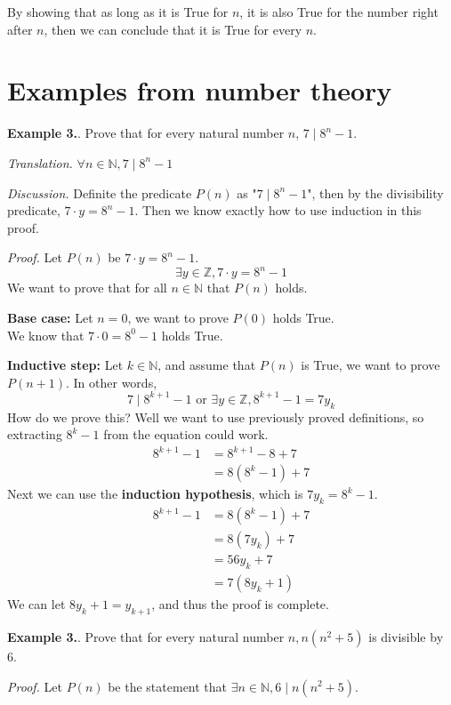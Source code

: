 \documentclass{article}
\newcounter{excount}
\newcommand\ex{\stepcounter{excount} \textbf{Example 3.\theexcount}. }
\begin{document}
By showing that as long as it is True for $n$, it is also True for the 
number right after $n$, then we can conclude that it is True for every $n$.

\newpage
\section{Examples from number theory} 
\ex Prove that for every natural number $n$, $7 \mid 8^n - 1$.

\textit{Translation.} $\forall n \in \mathbb{N}, 7 \mid 8^n - 1$

\textit{Discussion.} Definite the predicate $P(n)$ as "$7 \mid 8^n - 1$", 
then by the divisibility predicate, $7 \cdot y = 8^n - 1$. Then we know 
exactly how to use induction in this proof.

\textit{Proof.} Let $P(n)$ be $7 \cdot y = 8^n - 1.$
$$\exists y \in \mathbb{Z}, 7 \cdot y = 8^n - 1$$
We want to prove that for all $n \in \mathbb{N}$ that $P(n)$ holds.

\textbf{Base case:} Let $n = 0$, we want to prove $P(0)$ holds True. \\
We know that $7 \cdot 0 = 8^0 - 1$ holds True.

\textbf{Inductive step:} Let $k \in \mathbb{N}$, and assume that $P(n)$ 
is True, we want to prove $P(n+1)$. In other words, 
$$7 \mid 8^{k+1} - 1 \text{ or } \exists y \in \mathbb{Z}, 8^{k+1} - 1 = 
7y_k$$
How do we prove this? Well we want to use previously proved definitions, 
so extracting $8^k - 1 $ from the equation could work.
\begin{align*}
    8^{k+1} - 1 &= 8^{k+1} - 8 + 7 \\
                &= 8(8^k - 1) + 7 
\end{align*}
Next we can use the \textbf{induction hypothesis}, which is $7y_k = 8^k - 1$.
\begin{align*}
    8^{k+1} - 1 &= 8(8^k - 1) + 7 \\
                &= 8(7y_k) + 7 \\
                &= 56y_k + 7 \\
                &= 7(8y_k + 1)  
\end{align*}
We can let $8y_k + 1 = y_{k+1}$, and thus the proof is complete.

\ex Prove that for every natural number $n, n(n^2 + 5)$ is divisible by 6.

\textit{Proof.} Let $P(n)$ be the statement that $\exists n \in \mathbb{N}, 
6 \mid n (n^2 + 5)$.
\end{document}
